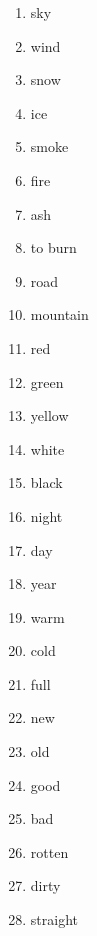 \begin{multicols}{2}
\begin{enumerate}
\item   sky 

\item   wind 

\item   snow 

\item   ice 

\item   smoke 

\item   fire 

\item   ash 

\item   to burn 

\item   road 

\item   mountain 

\item   red 

\item   green 

\item   yellow 

\item   white 

\item   black 

\item   night 

\item   day 

\item   year 

\item   warm 

\item   cold 

\item   full 

\item   new 

\item   old 

\item   good 

\item   bad 

\item   rotten 

\item   dirty 

\item   straight 


\end{enumerate}
\end{multicols}
